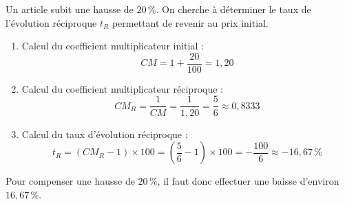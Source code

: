 \begin{exemple}
	Un article subit une hausse de $20\,\%$. On cherche à déterminer le taux de l'évolution réciproque $t_R$ permettant de revenir au prix initial.

	\begin{enumerate}
		\item {Calcul du coefficient multiplicateur initial :}
		      \[
			      CM = 1 + \frac{20}{100} = 1{,}20
		      \]
		\item {Calcul du coefficient multiplicateur réciproque :}
		      \[
			      CM_R = \frac{1}{CM} = \frac{1}{1{,}20} = \frac{5}{6} \approx 0{,}8333
		      \]
		\item {Calcul du taux d'évolution réciproque :}
		      \[
			      t_R = (CM_R - 1) \times 100 = \left( \frac{5}{6} - 1 \right) \times 100 = -\frac{100}{6} \approx -16{,}67\,\%
		      \]
	\end{enumerate}

	Pour compenser une hausse de $20\,\%$, il faut donc effectuer une baisse d'environ $16{,}67\,\%$.
\end{exemple}

\newpage

